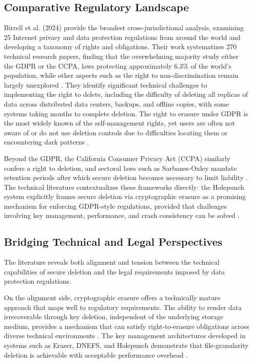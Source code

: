 \subsection{Comparative Regulatory Landscape}
Birrell et al. (2024) provide the broadest cross-jurisdictional analysis, examining 25 Internet 
privacy and data protection regulations from around the world and developing a taxonomy of rights 
and obligations. Their work systematizes 270 technical research papers, finding that the 
overwhelming majority study either the GDPR or the CCPA, laws protecting approximately 6.3\% of the 
world's population, while other aspects such as the right to non-discrimination remain largely 
unexplored \cite{Birrell2024SoK}. They identify significant technical challenges to implementing 
the right to delete, including the difficulty of deleting all replicas of data across distributed 
data centers, backups, and offline copies, with some systems taking months to complete deletion. 
The right to erasure under GDPR is the most widely known of the self-management rights, yet users 
are often not aware of or do not use deletion controls due to difficulties locating them or 
encountering dark patterns \cite{Birrell2024SoK}.

Beyond the GDPR, the California Consumer Privacy Act (CCPA) similarly confers a right to deletion, 
and sectoral laws such as Sarbanes-Oxley mandate retention periods after which secure deletion 
becomes necessary to limit liability \cite{AlgorithmicDestruction}. The technical literature 
contextualizes these frameworks directly: the Holepunch system explicitly frames secure deletion 
via cryptographic erasure as a promising mechanism for enforcing GDPR-style regulations, provided 
that challenges involving key management, performance, and crash consistency can be solved \cite{holepunch}.

\subsection*{Bridging Technical and Legal Perspectives}
The literature reveals both alignment and tension between the technical capabilities of secure 
deletion and the legal requirements imposed by data protection regulations.

On the alignment side, cryptographic erasure offers a technically mature approach that maps well 
to regulatory requirements. The ability to render data irrecoverable through key deletion, 
independent of the underlying storage medium, provides a mechanism that can satisfy 
right-to-erasure obligations across diverse technical environments \cite{reardon2013sok}. The key management 
architectures developed in systems such as Eraser, DNEFS, and Holepunch demonstrate that 
file-granularity deletion is achievable with acceptable performance overhead \cite{holepunch}.

